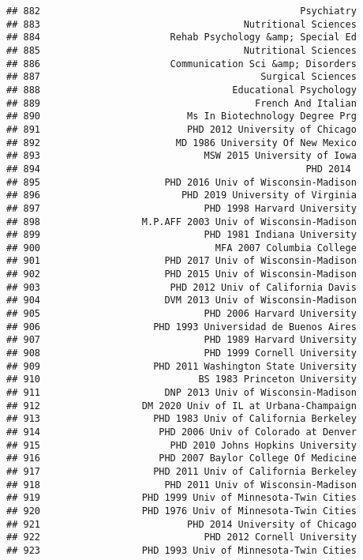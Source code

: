 \documentclass[
]{article}
\begin{document}
\begin{verbatim}
## 882                                              Psychiatry
## 883                                    Nutritional Sciences
## 884                       Rehab Psychology &amp; Special Ed
## 885                                    Nutritional Sciences
## 886                       Communication Sci &amp; Disorders
## 887                                       Surgical Sciences
## 888                                  Educational Psychology
## 889                                      French And Italian
## 890                          Ms In Biotechnology Degree Prg
## 891                          PHD 2012 University of Chicago
## 892                        MD 1986 University Of New Mexico
## 893                             MSW 2015 University of Iowa
## 894                                               PHD 2014 
## 895                      PHD 2016 Univ of Wisconsin-Madison
## 896                         PHD 2019 University of Virginia
## 897                             PHD 1998 Harvard University
## 898                  M.P.AFF 2003 Univ of Wisconsin-Madison
## 899                             PHD 1981 Indiana University
## 900                               MFA 2007 Columbia College
## 901                      PHD 2017 Univ of Wisconsin-Madison
## 902                      PHD 2015 Univ of Wisconsin-Madison
## 903                       PHD 2012 Univ of California Davis
## 904                      DVM 2013 Univ of Wisconsin-Madison
## 905                             PHD 2006 Harvard University
## 906                    PHD 1993 Universidad de Buenos Aires
## 907                             PHD 1989 Harvard University
## 908                             PHD 1999 Cornell University
## 909                    PHD 2011 Washington State University
## 910                            BS 1983 Princeton University
## 911                      DNP 2013 Univ of Wisconsin-Madison
## 912                  DM 2020 Univ of IL at Urbana-Champaign
## 913                    PHD 1983 Univ of California Berkeley
## 914                     PHD 2006 Univ of Colorado at Denver
## 915                       PHD 2010 Johns Hopkins University
## 916                     PHD 2007 Baylor College Of Medicine
## 917                    PHD 2011 Univ of California Berkeley
## 918                      PHD 2011 Univ of Wisconsin-Madison
## 919                  PHD 1999 Univ of Minnesota-Twin Cities
## 920                  PHD 1976 Univ of Minnesota-Twin Cities
## 921                          PHD 2014 University of Chicago
## 922                             PHD 2012 Cornell University
## 923                  PHD 1993 Univ of Minnesota-Twin Cities

\end{verbatim}
\end{document}
